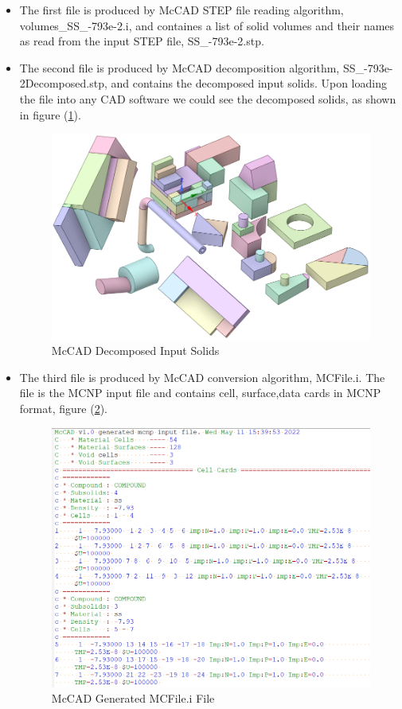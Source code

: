 \documentclass[12pt, a4paper, titlepage]{article}
\begin{document}
\begin{enumerate}
  \begin{itemize}
  	\item The first file is produced by McCAD STEP file reading algorithm, volumes\_SS\_-793e-2.i, and containes a list of solid volumes and their names as read from the input STEP file, SS\_-793e-2.stp.
  	
    \item The second file is produced by McCAD decomposition algorithm, SS\_-793e-2Decomposed.stp, and contains the decomposed input solids. Upon loading the file into any CAD software we could see the decomposed solids, as shown in figure (\ref{fig:Decomposed Solids}).
	\begin{figure}[h!]
		\centering
		\includegraphics[scale=0.4]{figures/decomposedSolids.png}
		\caption{McCAD Decomposed Input Solids}
		\label{fig:Decomposed Solids}
	\end{figure}

	\item The third file is produced by McCAD conversion algorithm, MCFile.i. The file is the MCNP input file and contains cell, surface,data cards in MCNP format, figure (\ref{fig:MCFile}).
	\begin{figure}[h!]
		\centering
		\includegraphics[scale=0.4]{figures/cellCards.png}
		\caption{McCAD Generated MCFile.i File}
		\label{fig:MCFile}
	\end{figure}


\end{itemize}
\end{enumerate}
\end{document}
